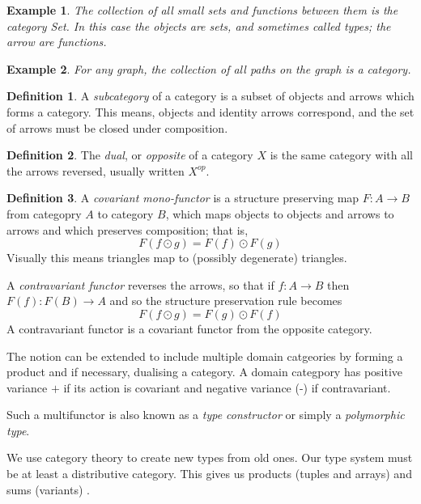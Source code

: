 \documentclass[oneside]{book}
\theoremstyle{plain}
\newtheorem{example}{Example}
\theoremstyle{definition}
\newtheorem{definition}{Definition}
\theoremstyle{plain}
\begin{document}
\begin{example}
The collection of all small sets and functions between them is 
the category {\em Set}.  In this case the objects are sets,
and sometimes called types; the arrow are functions.
\end{example}

\begin{example}
For any graph, the collection of
all paths on the graph is a category.
\end{example}

\begin{definition}
A {\em subcategory} of a category is a subset of objects and arrows
which forms a category. This means, objects and identity arrows
correspond, and the set of arrows must be closed under composition.
\end{definition}

\begin{definition}
The {\em dual}, or {\em opposite} of a category $X$ is the same
category with all the arrows reversed, usually written $X^{\mathit{op}}$.
\end{definition}

\begin{definition}
A {\em covariant mono-functor} is a structure preserving map
$F:A\rightarrow B$ from
categopry $A$ to category $B$, which maps objects to objects and
arrows to arrows and which preserves composition; that is,
$$F(f\odot g) = F(f) \odot F(g)$$
Visually this means triangles map to (possibly degenerate) triangles.

A {\em contravariant functor} reverses the arrows, so that
if $f:A\rightarrow B$ then $F(f):F(B)\rightarrow A$ and so
the structure preservation rule becomes 
$$F(f\odot g) = F(g) \odot F(f)$$
A contravariant functor is a covariant functor from the opposite
category.

The notion can be extended to include multiple domain catgeories 
by forming a product and if necessary, dualising a category.
A domain categpory has positive variance $+$ if its action
is covariant and negative variance (-) if contravariant.

Such a multifunctor is also known as a {\em type constructor}
or simply a {\em polymorphic type}.
\end{definition}

We use category theory \cite{category_theory} to create new types from old ones.
Our type system must be at least a distributive category.
This gives us products \cite{products} (tuples and arrays) 
and sums (variants) \cite{coproducts}.
\end{document}
